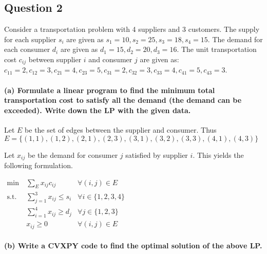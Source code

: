 \documentclass[11pt]{article}
\begin{document}
    \hypertarget{question-2}{%
\subsection{Question 2}\label{question-2}}

Consider a transportation problem with 4 suppliers and 3 customers. The
supply for each supplier \(s_i\) are given as
\(s_1 = 10, s_2 = 25, s_3 =18, s_4 = 15\). The demand for each consumer
\(d_i\) are given as \(d_1 = 15, d_2 = 20, d_3 = 16\). The unit
transportation cost \(c_{ij}\) between supplier \(i\) and consumer \(j\)
are given as:
\(c_{11} = 2, c_{12} = 3, c_{21} = 4, c_{23} = 5, c_{31} = 2, c_{32} = 3, c_{33} = 4, c_{41} = 5, c_{43} = 3\).

\hypertarget{a-formulate-a-linear-program-to-find-the-minimum-total-transportation-cost-to-satisfy-all-the-demand-the-demand-can-be-exceeded.-write-down-the-lp-with-the-given-data.}{%
\paragraph{(a) Formulate a linear program to find the minimum total
transportation cost to satisfy all the demand (the demand can be
exceeded). Write down the LP with the given
data.}\label{a-formulate-a-linear-program-to-find-the-minimum-total-transportation-cost-to-satisfy-all-the-demand-the-demand-can-be-exceeded.-write-down-the-lp-with-the-given-data.}}

Let \(E\) be the set of edges between the supplier and consumer. Thus
\(E = \{(1,1), (1,2), (2,1), (2,3), (3,1), (3,2), (3,3), (4,1), (4,3)\}\)

Let \(x_{ij}\) be the demand for consumer \(j\) satisfied by supplier
\(i\). This yields the following formulation.

\(\begin{aligned} \text{min} & \ \sum_{E} x_{ij}c_{ij} \ & \forall (i,j) \in E \\ \text{s.t.} & \ \sum_{j=1}^{3} x_{ij} \le s_i & \forall i \in \{1,2,3,4\} \\  & \ \sum_{i=1}^{4} x_{ij} \ge d_j & \forall j \in \{1,2,3\} \\  & \ x_{ij} \ge 0 & \forall (i,j) \in E \end{aligned}\)

\hypertarget{b-write-a-cvxpy-code-to-find-the-optimal-solution-of-the-above-lp.}{%
\paragraph{(b) Write a CVXPY code to find the optimal solution of the
above
LP.}\label{b-write-a-cvxpy-code-to-find-the-optimal-solution-of-the-above-lp.}}
\end{document}
